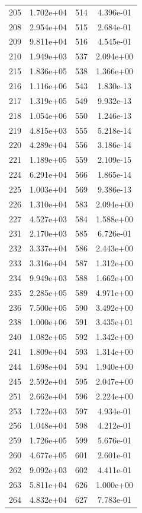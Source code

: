 \documentclass[12pt]{article}
\begin{document}
\begin{longtable}{@{}cccc@{}}
205 & 1.702e+04 & 514 & 4.396e-01 \\
208 & 2.954e+04 & 515 & 2.684e-01 \\
209 & 9.811e+04 & 516 & 4.545e-01 \\
210 & 1.949e+03 & 537 & 2.094e+00 \\
215 & 1.836e+05 & 538 & 1.366e+00 \\
216 & 1.116e+06 & 543 & 1.830e-13 \\
217 & 1.319e+05 & 549 & 9.932e-13 \\
218 & 1.054e+06 & 550 & 1.246e-13 \\
219 & 4.815e+03 & 555 & 5.218e-14 \\
220 & 4.289e+04 & 556 & 3.186e-14 \\
221 & 1.189e+05 & 559 & 2.109e-15 \\
224 & 6.291e+04 & 566 & 1.865e-14 \\
225 & 1.003e+04 & 569 & 9.386e-13 \\
226 & 1.310e+04 & 583 & 2.094e+00 \\
227 & 4.527e+03 & 584 & 1.588e+00 \\
231 & 2.170e+03 & 585 & 6.726e-01 \\
232 & 3.337e+04 & 586 & 2.443e+00 \\
233 & 3.316e+04 & 587 & 1.312e+00 \\
234 & 9.949e+03 & 588 & 1.662e+00 \\
235 & 2.285e+05 & 589 & 4.971e+00 \\
236 & 7.500e+05 & 590 & 3.492e+00 \\
238 & 1.000e+06 & 591 & 3.435e+01 \\
240 & 1.082e+05 & 592 & 1.342e+00 \\
241 & 1.809e+04 & 593 & 1.314e+00 \\
244 & 1.698e+04 & 594 & 1.940e+00 \\
245 & 2.592e+04 & 595 & 2.047e+00 \\
251 & 2.662e+04 & 596 & 2.224e+00 \\
253 & 1.722e+03 & 597 & 4.934e-01 \\
256 & 1.048e+04 & 598 & 4.212e-01 \\
259 & 1.726e+05 & 599 & 5.676e-01 \\
260 & 4.677e+05 & 601 & 2.601e-01 \\
262 & 9.092e+03 & 602 & 4.411e-01 \\
263 & 5.811e+04 & 626 & 1.000e+00 \\
264 & 4.832e+04 & 627 & 7.783e-01 \\

\end{longtable}
\end{document}
